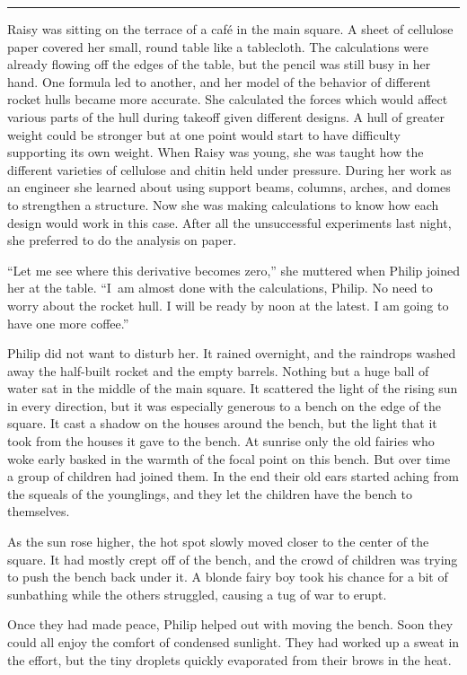 \documentclass[10pt]{memoir}
\renewcommand{\pfbreakdisplay}{\bigskip \ding{166} \bigskip}
\newcommand{\secbreak}{\fancybreak{\pfbreakdisplay}}
\begin{document}
\secbreak

Raisy was sitting on the terrace of a café in the main square. A sheet of
cellulose paper covered her small, round table like a tablecloth. The
calculations were already flowing off the edges of the table, but the pencil
was still busy in her hand. One formula led to another, and her model of the
behavior of different rocket hulls became more accurate. She calculated the
forces which would affect various parts of the hull during takeoff given
different designs. A hull of greater weight could be stronger but at one point
would start to have difficulty supporting its own weight. When Raisy was young,
she was taught how the different varieties of cellulose and chitin held under
pressure. During her work as an engineer she learned about using support beams,
columns, arches, and domes to strengthen a structure. Now she was making
calculations to know how each design would work in this case. After all the
unsuccessful experiments last night, she preferred to do the analysis on paper.

``Let me see where this derivative becomes zero,'' she muttered when Philip
joined her at the table. ``I~am almost done with the calculations, Philip. No
need to worry about the rocket hull. I will be ready by noon at the latest. I
am going to have one more coffee.''

Philip did not want to disturb her. It rained overnight, and the raindrops
washed away the half-built rocket and the empty barrels. Nothing but a huge
ball of water sat in the middle of the main square. It scattered the light of
the rising sun in every direction, but it was especially generous to a bench on
the edge of the square. It cast a shadow on the houses around the bench, but
the light that it took from the houses it gave to the bench. At sunrise only
the old fairies who woke early basked in the warmth of the focal point on this
bench. But over time a group of children had joined them. In the end their old
ears started aching from the squeals of the younglings, and they let the
children have the bench to themselves.

As the sun rose higher, the hot spot slowly moved closer to the center of the
square. It had mostly crept off of the bench, and the crowd of children was
trying to push the bench back under it. A blonde fairy boy took his chance for
a bit of sunbathing while the others struggled, causing a tug of war to erupt.

Once they had made peace, Philip helped out with moving the bench. Soon they
could all enjoy the comfort of condensed sunlight. They had worked up a sweat
in the effort, but the tiny droplets quickly evaporated from their brows in the
heat.
\end{document}
